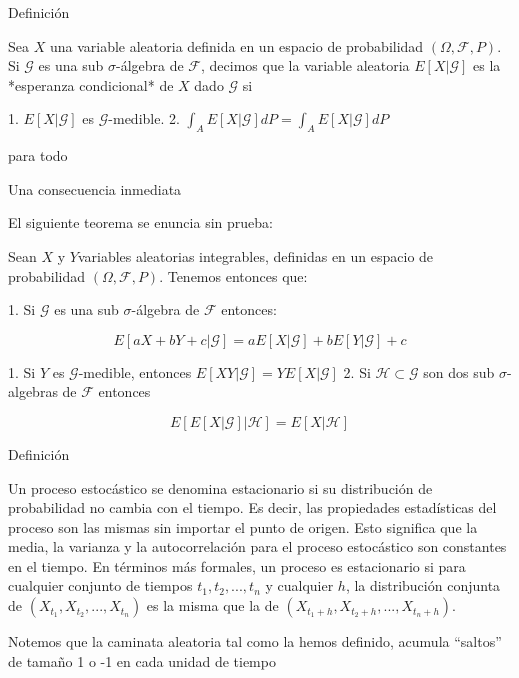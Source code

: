 \documentclass{extreport}
\theoremstyle{definicion}
\theoremstyle{propiedad}
\begin{document}
Definición

Sea $X$ una variable aleatoria definida en un espacio de probabilidad $(\Omega, \mathcal{F}, P)$. Si $\mathcal{G}$ es una sub $\sigma$-álgebra de $\mathcal{F}$, decimos que la variable aleatoria $E\left[X\vert\mathcal{G}\right]$ es la *esperanza condicional* de $X$ dado $\mathcal{G}$ si

1. $E\left[X\vert \mathcal{G}\right]$ es $\mathcal{G}$-medible.
2. $\int_A E\left[X\vert \mathcal{G}\right]dP = \int_A E\left[X\vert \mathcal{G}\right]dP$

para todo 

Una consecuencia inmediata

El siguiente teorema se enuncia sin prueba:

Sean $X$ y $Y$variables  aleatorias integrables, definidas en un espacio de probabilidad $(\Omega, \mathcal{F},P)$.   Tenemos entonces que:

1. Si $\mathcal{G}$ es una sub $\sigma$-álgebra de $\mathcal{F}$ entonces:

$$
E\left[a X + bY +c\vert \mathcal{G}\right] = aE\left[X\vert \mathcal{G}\right] +bE\left[Y\vert \mathcal{G}\right] +c
$$

1. Si $Y$ es $\mathcal{G}$-medible, entonces $E\left[XY\vert \mathcal{G}\right] = YE\left[X\vert \mathcal{G}\right]$  
2. Si $\mathcal{H}\subset\mathcal{G}$ son dos sub $\sigma$-algebras de $\mathcal{F}$  entonces

$$
E\left[E\left[X\vert \mathcal{G}\right]\vert \mathcal{H}\right] = E\left[X\vert \mathcal{H}\right]
$$



Definición

Un proceso estocástico se denomina estacionario si su distribución de probabilidad no cambia con el tiempo. Es decir, las propiedades estadísticas del proceso son las mismas sin importar el punto de origen. Esto significa que la media, la varianza y la autocorrelación para el proceso estocástico son constantes en el tiempo. En términos más formales, un proceso es estacionario si para cualquier conjunto de tiempos $t_1, t_2, ..., t_n$ y cualquier $h$, la distribución conjunta de $(X_{t_1}, X_{t_2}, ..., X_{t_n})$ es la misma que la de $(X_{t_1+h}, X_{t_2+h}, ..., X_{t_n+h})$.

Notemos que la caminata aleatoria tal como la hemos definido, acumula “saltos” de tamaño 1 o -1 en cada unidad de tiempo 
\end{document}
